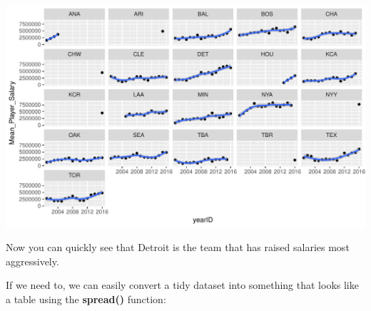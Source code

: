 \documentclass[]{book}
\newenvironment{Shaded}{\begin{snugshade}}{\end{snugshade}}
\newcommand{\DataTypeTok}[1]{\textcolor[rgb]{0.13,0.29,0.53}{#1}}
\newcommand{\DecValTok}[1]{\textcolor[rgb]{0.00,0.00,0.81}{#1}}
\newcommand{\KeywordTok}[1]{\textcolor[rgb]{0.13,0.29,0.53}{\textbf{#1}}}
\newcommand{\NormalTok}[1]{#1}
\newcommand{\OperatorTok}[1]{\textcolor[rgb]{0.81,0.36,0.00}{\textbf{#1}}}
\newcommand{\StringTok}[1]{\textcolor[rgb]{0.31,0.60,0.02}{#1}}
\theoremstyle{definition}
\theoremstyle{definition}
\theoremstyle{definition}
\theoremstyle{remark}
\begin{document}
\begin{Shaded}
\end{Shaded}

\begin{center}\includegraphics[width=0.7\linewidth]{DS4PS-I_files/figure-latex/unnamed-chunk-130-1} \end{center}

Now you can quickly see that Detroit is the team that has raised
salaries most aggressively.

If we need to, we can easily convert a tidy dataset into something that
looks like a table using the \textbf{spread()} function:
\end{document}
